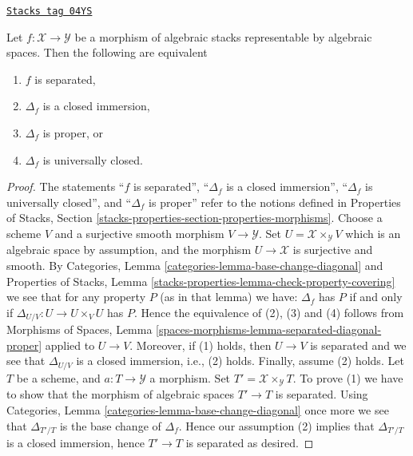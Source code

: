 \begin{lemma}
\label{stacks-morphisms-lemma-representable-separated-diagonal-closed}
\href{https://stacks.math.columbia.edu/tag/04YS}{\texttt{Stacks tag 04YS}}

Let $f : \mathcal{X} \to \mathcal{Y}$ be a morphism of algebraic stacks
representable by algebraic spaces. Then the following are equivalent
\begin{enumerate}
\item $f$ is separated,
\item $\Delta_f$ is a closed immersion,
\item $\Delta_f$ is proper, or
\item $\Delta_f$ is universally closed.
\end{enumerate}
\end{lemma}

\begin{proof}
The statements
``$f$ is separated'',
``$\Delta_f$ is a closed immersion'',
``$\Delta_f$ is universally closed'', and
``$\Delta_f$ is proper''
refer to the notions defined in
Properties of Stacks,
Section \ref{stacks-properties-section-properties-morphisms}.
Choose a scheme $V$ and a surjective smooth morphism $V \to \mathcal{Y}$.
Set $U = \mathcal{X} \times_\mathcal{Y} V$ which is an algebraic
space by assumption, and the morphism $U \to \mathcal{X}$ is surjective
and smooth. By
Categories, Lemma \ref{categories-lemma-base-change-diagonal}
and
Properties of Stacks,
Lemma \ref{stacks-properties-lemma-check-property-covering}
we see that for any property $P$ (as in that lemma) we have:
$\Delta_f$ has $P$ if and only if $\Delta_{U/V} : U \to  U \times_V U$ has $P$.
Hence the equivalence of (2), (3) and (4) follows from
Morphisms of Spaces,
Lemma \ref{spaces-morphisms-lemma-separated-diagonal-proper}
applied to $U \to V$.
Moreover, if (1) holds, then $U \to V$ is separated and we see that
$\Delta_{U/V}$ is a closed immersion, i.e., (2) holds.
Finally, assume (2) holds. Let $T$ be a scheme, and $a : T \to \mathcal{Y}$
a morphism. Set $T' = \mathcal{X} \times_\mathcal{Y} T$. To prove
(1) we have to show that the morphism of algebraic spaces $T' \to T$
is separated. Using
Categories, Lemma \ref{categories-lemma-base-change-diagonal}
once more we see that $\Delta_{T'/T}$ is the base change of
$\Delta_f$. Hence our assumption (2) implies that $\Delta_{T'/T}$
is a closed immersion, hence $T' \to T$ is separated as desired.
\end{proof}

